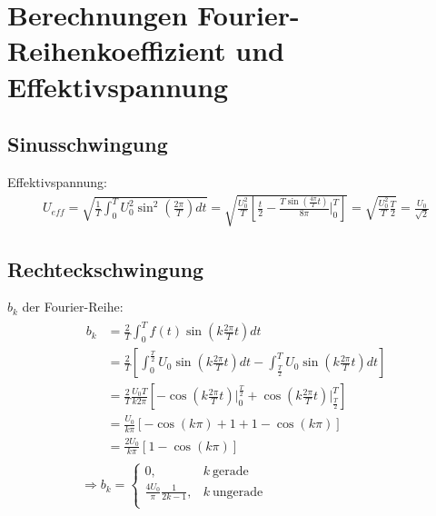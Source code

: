

\chapter{Berechnungen Fourier-Reihenkoeffizient und Effektivspannung}
\label{app:Berechnung}

\section*{Sinusschwingung}
Effektivspannung:
\begin{gather}
    U_{eff} = \sqrt{\frac{1}{T}\int^T_0 U_0^2 \sin^2\left(\frac{2\pi}{T}\right) dt} = \sqrt{\frac{U_0^2}{T} \left[\frac{t}{2} - \frac{T\sin(\frac{4\pi}{T}t)}{8\pi}\bigg \vert^T_0 \right]} = \sqrt{\frac{U_0^2}{T}\frac{T}{2}} = \frac{U_0}{\sqrt{2}}
\end{gather}

\section*{Rechteckschwingung}
$b_k$ der Fourier-Reihe:
\begin{gather}
    \begin{aligned}
        b_k &= \frac{2}{T} \int^{T}_{0} f(t)\sin(k \frac{2\pi}{T} t)dt\\
            &= \frac{2}{T} \left[ \int^{\frac{T}{2}}_{0} U_0\sin(k \frac{2\pi}{T} t)dt - \int^{T}_{\frac{T}{2}} U_0\sin(k \frac{2\pi}{T} t)dt\right]\\
            &= \frac{2}{T}\frac{U_0T}{k2\pi} \left[-\cos(k \frac{2\pi}{T} t) \bigg \vert^{\frac{T}{2}}_{0} + \cos(k \frac{2\pi}{T} t) \bigg \vert^{T}_{\frac{T}{2}} \right]\\
            &= \frac{U_0}{k\pi} \left[-\cos(k\pi)+1 + 1 - \cos(k\pi)\right]\\
            &= \frac{2U_0}{k\pi}\left[1-\cos(k\pi)\right]
    \end{aligned}\\[0,5cm]
    \Rightarrow b_k =
    \begin{cases}
        0, & k~\text{gerade}\\
        \frac{4U_0}{\pi}\frac{1}{2k-1}, & k~\text{ungerade}\\
    \end{cases}
\end{gather}

